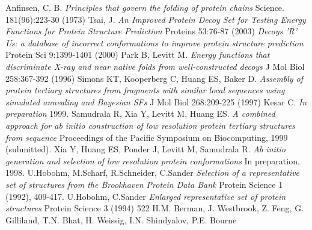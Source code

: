 \documentclass[a4paper,20pt,notitlepage,openbib]{article}
\begin{document}
\begin{thebibliography}{99}

Anfinsen, C. B.
\emph{Principles that govern the folding of protein chains}
Science. 181(96):223-30 (1973)
Tsai, J.
\emph{An Improved Protein Decoy Set for Testing Energy Functions for Protein Structure Prediction}
Proteins 53:76-87 (2003)
\emph{Decoys 'R' Us: a database of incorrect conformations to improve protein structure prediction}
Protein Sci 9:1399-1401 (2000)
Park B, Levitt M.
\emph{Energy functions that discriminate X-ray and near native folds from well-constructed decoys}
J Mol Biol 258:367-392 (1996)
Simons KT, Kooperberg C, Huang ES, Baker D.
\emph{Assembly of protein tertiary structures from fragments with similar local sequences using simulated annealing and Bayesian SFs}
J Mol Biol 268:209-225 (1997)
Kesar C.
\emph{In preparation}
1999.
Samudrala R, Xia Y, Levitt M, Huang ES.
\emph{A combined approach for ab initio construction of low resolution protein tertiary structures from sequence}
Proceedings of the Pacific Symposium on Biocomputing, 1999 (submitted).
Xia Y, Huang ES, Ponder J, Levitt M, Samudrala R.
\emph{Ab initio generation and selection of low resolution protein conformations}
In preparation, 1998.
U.Hobohm, M.Scharf, R.Schneider, C.Sander
\emph{Selection of a representative set of structures from the Brookhaven Protein Data Bank}
Protein Science 1 (1992), 409-417.
U.Hobohm, C.Sander
\emph{Enlarged representative set of protein structures}
Protein Science 3 (1994) 522
H.M. Berman, J. Westbrook, Z. Feng, G. Gilliland, T.N. Bhat, H. Weissig, I.N. Shindyalov, P.E. Bourne

\end{thebibliography}
\end{document}
